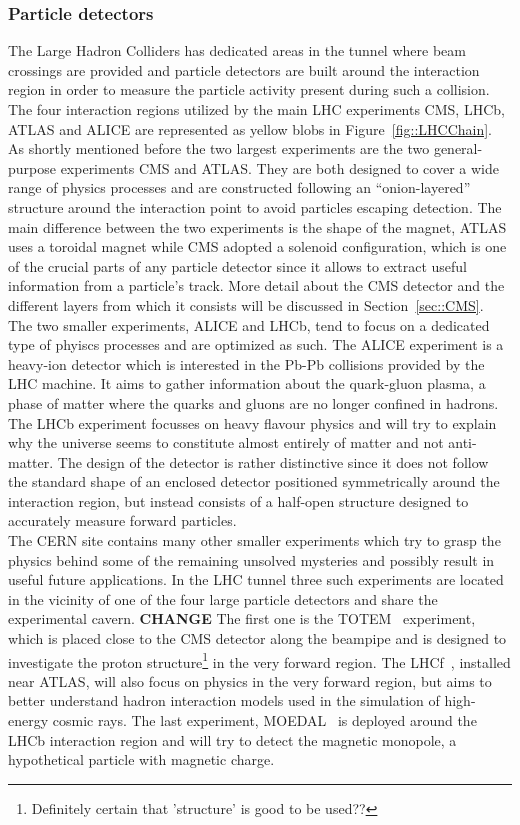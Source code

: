 \subsubsection{Particle detectors}
The Large Hadron Colliders has dedicated areas in the tunnel where beam crossings are provided and particle detectors are built around the interaction region in order to measure the particle activity present during such a collision. The four interaction regions utilized by the main LHC experiments CMS, LHCb, ATLAS and ALICE are represented as yellow blobs in Figure~\ref{fig::LHCChain}. 
\\
As shortly mentioned before the two largest experiments are the two general-purpose experiments CMS and ATLAS. They are both designed to cover a wide range of physics processes and are constructed following an ``onion-layered'' structure around the interaction point to avoid particles escaping detection. The main difference between the two experiments is the shape of the magnet, ATLAS uses a toroidal magnet while CMS adopted a solenoid configuration, which is one of the crucial parts of any particle detector since it allows to extract useful information from a particle's track. More detail about the CMS detector and the different layers from which it consists will be discussed in Section~\ref{sec::CMS}.
\\
The two smaller experiments, ALICE and LHCb, tend to focus on a dedicated type of phyiscs processes and are optimized as such. The ALICE experiment is a heavy-ion detector which is interested in the Pb-Pb collisions provided by the LHC machine. It aims to gather information about the quark-gluon plasma, a phase of matter where the quarks and gluons are no longer confined in hadrons. The LHCb experiment focusses on heavy flavour physics and will try to explain why the universe seems to constitute almost entirely of matter and not anti-matter. The design of the detector is rather distinctive since it does not follow the standard shape of an enclosed detector positioned symmetrically around the interaction region, but instead consists of a half-open structure designed to accurately measure forward particles.
\\
The CERN site contains many other smaller experiments which try to grasp the physics behind some of the remaining unsolved mysteries and possibly result in useful future applications. In the LHC tunnel three such experiments are located in the vicinity of one of the four large particle detectors and share the experimental cavern. \textbf{CHANGE}
The first one is the TOTEM~\cite{} experiment, which is placed close to the CMS detector along the beampipe and is designed to investigate the proton structure\footnote{Definitely certain that 'structure' is good to be used??} in the very forward region. The LHCf~\cite{}, installed near ATLAS, will also focus on physics in the very forward region, but aims to better understand hadron interaction models used in the simulation of high-energy cosmic rays.
The last experiment, MOEDAL~\cite{} is deployed around the LHCb interaction region and will try to detect the magnetic monopole, a hypothetical particle with magnetic charge.

